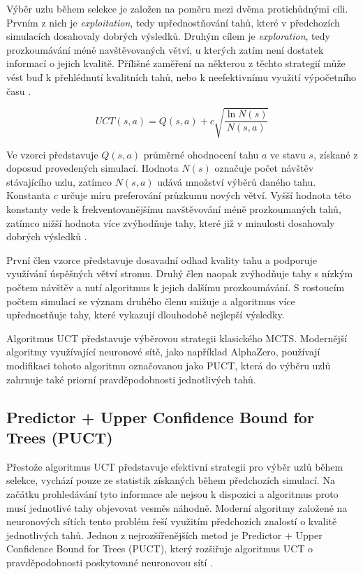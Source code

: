 Výběr uzlu během selekce je založen na poměru mezi dvěma protichůdnými cíli. Prvním z nich je \emph{exploitation}, tedy 
upřednostňování tahů, které v předchozích simulacích dosahovaly dobrých výsledků. Druhým cílem je \emph{exploration}, tedy 
prozkoumávání méně navštěvovaných větví, u kterých zatím není dostatek informací o jejich kvalitě. Přílišné zaměření na 
některou z těchto strategií může vést buď k přehlédnutí kvalitních tahů, nebo k neefektivnímu využití výpočetního času \cite{kocsis2006uct,browne2012mcts}.

\[
UCT(s,a)=
Q(s,a)
+
c
\sqrt{\frac{\ln N(s)}{N(s,a)}}
\]

Ve vzorci představuje $Q(s,a)$ průměrné ohodnocení tahu $a$ ve stavu $s$, získané z doposud provedených simulací. 
Hodnota $N(s)$ označuje počet návštěv stávajícího uzlu, zatímco $N(s,a)$ udává množství výběrů daného tahu. Konstanta $c$ 
určuje míru preferování průzkumu nových větví. Vyšší hodnota této konstanty vede k frekventovanějšímu navštěvování méně prozkoumaných tahů, 
zatímco nižší hodnota více zvýhodňuje tahy, které již v minulosti dosahovaly dobrých výsledků \cite{kocsis2006uct}.

První člen vzorce představuje dosavadní odhad kvality tahu a podporuje využívání úspěšných větví stromu. 
Druhý člen naopak zvýhodňuje tahy s nízkým počtem návštěv a nutí algoritmus k jejich dalšímu prozkoumávání. 
S rostoucím počtem simulací se význam druhého členu snižuje a algoritmus více upřednostňuje tahy, 
které vykazují dlouhodobě nejlepší výsledky.

Algoritmus UCT představuje výběrovou strategii klasického MCTS. Modernější algoritmy využívající neuronové sítě, 
jako například AlphaZero, používají modifikaci tohoto algoritmu označovanou jako PUCT, která do výběru uzlů zahrnuje také priorní 
pravděpodobnosti jednotlivých tahů.

\subsection{Predictor + Upper Confidence Bound for Trees (PUCT)}

Přestože algoritmus UCT představuje efektivní strategii pro výběr uzlů během selekce, vychází pouze ze statistik 
získaných během předchozích simulací. Na začátku prohledávání tyto informace ale nejsou k dispozici a algoritmus proto musí 
jednotlivé tahy objevovat vesměs náhodně. Moderní algoritmy založené na neuronových sítích tento problém řeší využitím předchozích 
znalostí o kvalitě jednotlivých tahů. Jednou z nejrozšířenějších metod je Predictor + Upper Confidence Bound for Trees (PUCT), který 
rozšiřuje algoritmus UCT o pravděpodobnosti poskytované neuronovou sítí \cite{silver2017alphazero}.

